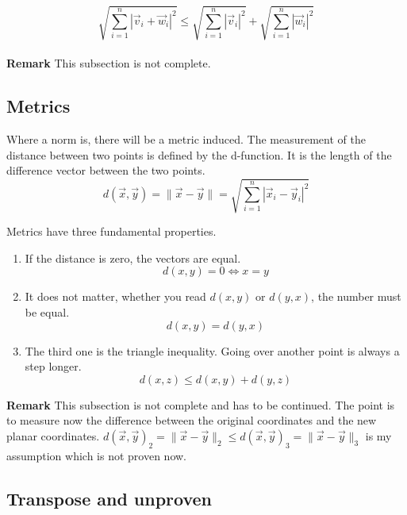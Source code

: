 \documentclass[a4paper]{article}
\begin{document}
\begin{displaymath}
    \sqrt{\sum_{i=1}^{n}|\vec{v}_i + \vec{w}_i|^{2}} \leq \sqrt{\sum_{i=1}^{n}|\vec{v}_i|^{2}} + \sqrt{\sum_{i=1}^{n}|\vec{w}_i|^{2}} 
\end{displaymath}\\

\textbf{Remark} This subsection is not complete.

\subsection{Metrics}

Where a norm is, there will be a metric induced.
The measurement of the distance between two points is defined by the d-function. It is the length of the difference vector between the two points.\\
\begin{displaymath}
    d(\vec{x}, \vec{y}) = \|\vec{x}-\vec{y}\| = \sqrt{\sum_{i=1}^{n}|\vec{x}_i-\vec{y}_i|^2}
\end{displaymath}

Metrics have three fundamental properties.
\begin{enumerate}
\item If the distance is zero, the vectors are equal.
\begin{displaymath}
d(x,y) = 0 \iff x = y
\end{displaymath}
\item It does not matter, whether you read $d(x,y)$ or $d(y,x)$, the number must be equal.
\begin{displaymath}
d(x,y) = d(y,x)
\end{displaymath}
\item The third one is the triangle inequality. Going over another point is always a step longer.
\begin{displaymath}
d(x,z) \leq d(x,y) + d(y,z) 
\end{displaymath}
\end{enumerate}


\textbf{Remark} This subsection is not complete and has to be continued. The point is to measure now the difference between the original coordinates and the new planar coordinates. $d(\vec{x}, \vec{y})_2 = \|\vec{x}-\vec{y}\|_2 \leq d(\vec{x}, \vec{y})_3 = \|\vec{x}-\vec{y}\|_3$ is my assumption which is not proven now.

\subsection{Transpose and unproven}
\end{document}
